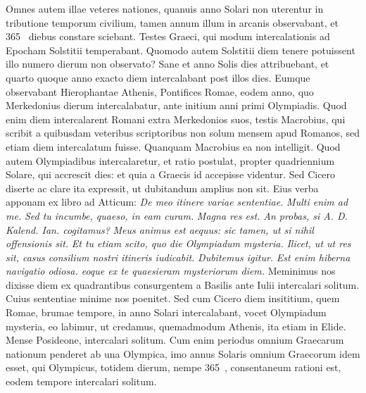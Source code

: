 Omnes autem illae veteres nationes,
quanuis anno Solari non uterentur in tributione temporum civilium,
tamen annum illum in arcanis observabant, et 365~ diebus constare
sciebant.
Testes Graeci, qui modum intercalationis ad Epocham
Solstitii temperabant.
Quomodo autem Solstitii diem tenere potuissent
illo numero dierum non observato?
Sane et anno Solis dies
 attribuebant, et quarto quoque anno exacto diem intercalabant
post  illos dies.
Eumque observabant Hierophantae
Athenis, Pontifices Romae, eodem anno, quo Merkedonius 
dierum intercalabatur, ante initium anni primi Olympiadis.
Quod
enim diem intercalarent Romani extra Merkedonios suos, testis Macrobius,
qui scribit a quibusdam veteribus scriptoribus non solum
mensem apud Romanos, sed etiam diem intercalatum fuisse.
Quanquam
Macrobius ea non intelligit.
Quod autem Olympiadibus
intercalaretur, et ratio postulat, propter quadriennium Solare, qui accrescit
dies: et quia a Graecis id accepisse videntur.
%
Sed Cicero diserte
ac clare ita expressit, ut dubitandum amplius non sit.
Eius verba
apponam ex libro  ad Atticum:
 \textit{De meo itinere variae sententiae.}
\textit{Multi enim ad me.}
\textit{Sed tu incumbe, quaeso, in eam curam.}
\textit{Magna
res est.}
\textit{An probas, si A. D. Kalend. Ian. cogitamus?} %
\textit{Meus animus
est aequus: sic tamen, ut si nihil offensionis sit.}
\textit{Et tu etiam scito, quo
die Olympiadum mysteria.}
\textit{Ilicet, ut ut res sit, casus consilium nostri
itineris iudicabit.}
\textit{Dubitemus igitur.}
\textit{Est enim hiberna navigatio
odiosa. eoque ex te quaesieram mysteriorum diem.}
Meminimus nos dixisse
diem ex quadrantibus consurgentem a Basilis ante  Iulii intercalari
solitum.
Cuius sententiae minime nos poenitet.
Sed cum Cicero diem
insititium, quem Romae, brumae tempore, in anno Solari intercalabant,
vocet Olympiadum mysteria, eo labimur, ut credamus, quemadmodum
Athenis, ita etiam in Elide.
%
Mense Posideone, intercalari solitum.
Cum enim periodus omnium Graecarum nationum penderet
ab una Olympica, imo annus Solaris omnium Graecorum idem
esset, qui Olympicus, totidem dierum, nempe 365~, consentaneum
rationi est, eodem tempore intercalari solitum.
